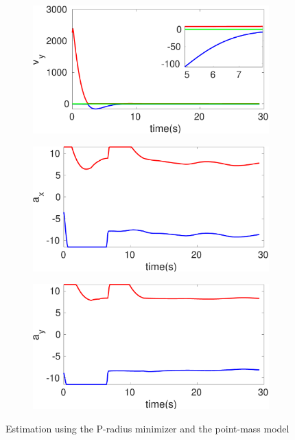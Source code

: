 \begin{figure}[h]
\begin{subfigure}{.5\linewidth}
\end{subfigure}
\begin{subfigure}{.5\linewidth}
\centering
\includegraphics[width=\linewidth]{figures/Prad/s3pmpradv_y}
\end{subfigure}
\begin{subfigure}{.5\linewidth}
\centering
\includegraphics[width=\linewidth]{figures/Prad/s3pmprada_x}
\end{subfigure}
\begin{subfigure}{.5\linewidth}
\centering
\includegraphics[width=\linewidth]{figures/Prad/s3pmprada_y}
\end{subfigure}
\caption{Estimation using the P-radius minimizer and the point-mass model}
\end{figure}


